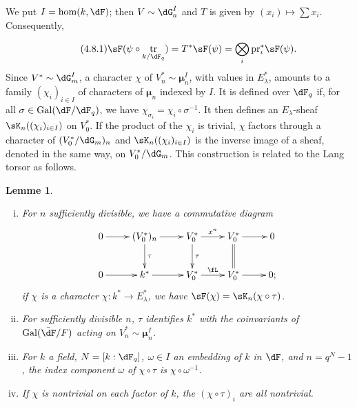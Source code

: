 \documentclass[oneside]{book}
\DeclareMathOperator{\gal}{Gal}
\DeclareMathOperator{\tr}{tr}
\newcommand{\dmu}{{\bm\mu}}
\newcounter{char}
\newcommand{\pr}{\mathrm{pr}} %
\theoremstyle{sga-source}
\theoremstyle{sga-source-dash}
\theoremstyle{sga-source-dotdash}
\theoremstyle{sga-source-number-note-dash}
\theoremstyle{sga-source-note-number-dotdash}
\theoremstyle{sga-source-example-dotdash}
\theoremstyle{sga-source-inline-number}
\theoremstyle{sga-source-bare-number}
\theoremstyle{sga-source}
\newtheorem{lemma_}[subsection]{Lemme}
\newcommand{\PrintPage}[1]{}\newcommand{\MathPage}[1]{}\newcommand{\PrintCite}[2]{#1}\newcommand{\var}[3]{#1}
\begin{document}
We put $I=\hom(k,\dF)$; then $V\sim \dG_a^I$ and $T$ is given by 
$(x_i)\mapsto \sum x_i$. Consequently, 
\PrintPage{200}
\begin{equation*}\tag{4.8.1}\label{VI:eq:4-8-1}
  \sF(\psi\circ \tr_{k/\dF_q}) = T^\ast \sF(\psi) = \bigotimes_i \pr_i^\ast \sF(\psi) \text{.} 
\end{equation*}
Since $V^\ast\sim \dG_m^I$, a character $\chi$ of $V_n^\ast\sim \dmu_n^I$, 
with values in $E_\lambda^\ast$, amounts to a family 
$(\chi_i)_{i\in I}$ of characters of $\dmu_n$ indexed by $I$. It is 
defined over $\dF_q$ if, for all $\sigma\in \gal(\dF/\dF_q)$, we have 
$\chi_{\sigma_i} = \chi_i\circ \sigma^{-1}$. It then defines an $E_\lambda$-sheaf $\sK_n((\chi_i)_{i\in I})$ on $V_0^\ast$. If the product 
of the $\chi_i$ is trivial, $\chi$ factors through a character of 
$(V_0^\ast/\dG_m)_n$ and $\sK_n((\chi_i)_{i\in I})$ is the inverse image 
of a sheaf, denoted in the same way, on $V_0^\ast/\dG_m$. This construction 
is related to the Lang torsor as follows. 





\begin{lemma_}\label{VI:4-9}
\begin{enumerate}[(i)]
  \item For $n$ sufficiently divisible, we have a commutative diagram 
    \[\xymatrix{
      0 \ar[r] 
        & (V_0^\ast)_n \ar[r] \ar[d]^-\tau 
        & V_0^\ast \ar[r]^-{x^n} \ar[d]^-\tau 
        & V_0^\ast \ar[r] \ar@{=}[d] 
        & 0 \\
      0 \ar[r] 
        & k^\ast \ar[r] 
        & V_0^\ast \ar[r]^-\fL 
        & V_0^\ast \ar[r] 
        & 0 \text{;} 
    }\]
    if $\chi$ is a character $\chi:k^\ast \to E_\lambda^\ast$, we have 
    $\sF(\chi) = \sK_n(\chi\circ\tau)$. 
  \item For sufficiently divisible $n$, $\tau$ identifies $k^\ast$ with the coinvariants 
    of $\var{\gal(\bar\dF/F)}{\gal(\dF/\dF_q)}{S45-SOL-0819}$ acting on $V_n^\ast\sim \dmu_n^I$. 
  \item For $k$ a field, $N=[k:\dF_q]$, $\omega\in I$ an embedding of $k$ 
    in $\dF$, and $n=q^N-1$, the index component $\omega$ of 
    $\chi\circ\tau$ is $\chi\circ \omega^{-1}$. 
  \item If $\chi$ is nontrivial on each factor of $k$, the 
    $(\chi\circ \tau)_i$ are all nontrivial. 
\end{enumerate}
\end{lemma_}
\end{document}
